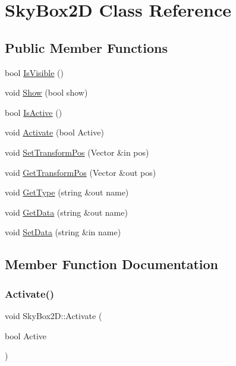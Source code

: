 \hypertarget{class_sky_box2_d}{}\section{Sky\+Box2D Class Reference}
\label{class_sky_box2_d}
\subsection*{Public Member Functions}
\begin{DoxyCompactItemize}
\item 
bool \hyperlink{class_sky_box2_d_a7254a706c29b3108876ac07a0ea17779}{Is\+Visible} ()
\item 
void \hyperlink{class_sky_box2_d_ac0263a32805d4181dde4bd23178554b5}{Show} (bool show)
\item 
bool \hyperlink{class_sky_box2_d_aadb71254cf3e64183d177c37bbfcab2c}{Is\+Active} ()
\item 
void \hyperlink{class_sky_box2_d_a0543aeaac5f184dfeb673fe20ce806dc}{Activate} (bool Active)
\item 
void \hyperlink{class_sky_box2_d_ae8ea2553fe9f28919de8c80305264750}{Set\+Transform\+Pos} (Vector \&in pos)
\item 
void \hyperlink{class_sky_box2_d_a06c0595d530b08f15990614915b01782}{Get\+Transform\+Pos} (Vector \&out pos)
\item 
void \hyperlink{class_sky_box2_d_a55fee69fdbeaf062f83a810c612a0896}{Get\+Type} (string \&out name)
\item 
void \hyperlink{class_sky_box2_d_a1e1ce9ba7f691b71b8d1f91b86949b77}{Get\+Data} (string \&out name)
\item 
void \hyperlink{class_sky_box2_d_a3eef8acd8c8022bbad07521ad710fe71}{Set\+Data} (string \&in name)
\end{DoxyCompactItemize}


\subsection{Member Function Documentation}
\hypertarget{class_sky_box2_d_a0543aeaac5f184dfeb673fe20ce806dc}{}\label{class_sky_box2_d_a0543aeaac5f184dfeb673fe20ce806dc} 
\subsubsection{\texorpdfstring{Activate()}{Activate()}}
{\footnotesize\ttfamily void Sky\+Box2\+D\+::\+Activate (\begin{DoxyParamCaption}\item[{bool}]{Active }\end{DoxyParamCaption})}

